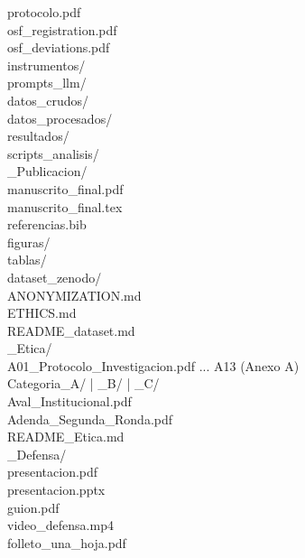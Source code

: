 \documentclass[11pt,a4paper]{article}
\begin{document}
\begin{evidbox}[title=Árbol de carpetas obligatorio de la Entrega 4 (2B / Defensa)]
\begin{tabbing}
            \>\>protocolo.pdf\\
            \>\>osf\_registration.pdf\\
            \>\>osf\_deviations.pdf\\
            \>\>instrumentos/\\
            \>\>prompts\_llm/\\
            \>\>datos\_crudos/\\
            \>\>datos\_procesados/\\
            \>\>resultados/\\
            \>\>scripts\_analisis/\\
            \_Publicacion/\\
            \>\>manuscrito\_final.pdf\\
            \>\>manuscrito\_final.tex\\
            \>\>referencias.bib\\
            \>\>figuras/\\
            \>\>tablas/\\
            \>\>dataset\_zenodo/\\
            \>\>\>ANONYMIZATION.md\\
            \>\>\>ETHICS.md\\
            \>\>\>README\_dataset.md\\
            \_Etica/\\
            \>\>A01\_Protocolo\_Investigacion.pdf ... A13 (Anexo A)\\
            \>\>Categoria\_A/ | \_B/ | \_C/\\
            \>\>Aval\_Institucional.pdf\\
            \>\>Adenda\_Segunda\_Ronda.pdf\\
            \>\>README\_Etica.md\\
            \_Defensa/\\
            \>\>presentacion.pdf\\
            \>\>presentacion.pptx\\
            \>\>guion.pdf\\
            \>\>video\_defensa.mp4\\
            \>\>folleto\_una\_hoja.pdf
        \end{tabbing}
    \endgroup
\end{evidbox}
\end{document}

